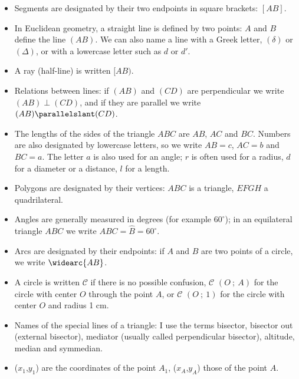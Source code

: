 \begin{itemize}
In the code, these points are referred to as M\_A, M\_B and M\_C.

Another exception concerns intermediate construction points, which are not labelled. They are often designated by a lowercase letter in the code.

\item Segments are designated by their two endpoints in square brackets: $[AB]$.

\item In Euclidean geometry, a straight line is defined by two points: $A$ and $B$ define the line $(AB)$. We can also name a line with a Greek letter, $(\delta)$ or $(\Delta)$, or with a lowercase letter such as $d$ or $d'$.

\item A ray (half-line) is written $[AB)$.

\item Relations between lines: if $(AB)$ and $(CD)$ are perpendicular we write $(AB) \perp (CD)$, and if they are parallel we write $(AB) \parallelslant (CD)$.

\item The lengths of the sides of the triangle $ABC$ are $AB$, $AC$ and $BC$. Numbers are also designated by lowercase letters, so we write $AB=c$, $AC=b$ and $BC=a$. The letter $a$ is also used for an angle; $r$ is often used for a radius, $d$ for a diameter or a distance, $l$ for a length.

\item Polygons are designated by their vertices: $ABC$ is a triangle, $EFGH$ a quadrilateral.

\item Angles are generally measured in degrees (for example $60^\circ$); in an equilateral triangle $ABC$ we write $\widehat{ABC}=\widehat{B}=60^\circ$.

\item Arcs are designated by their endpoints: if $A$ and $B$ are two points of a circle, we write $\widearc{AB}$.

\item A circle is written $\mathcal{C}$ if there is no possible confusion, $\mathcal{C}$ $(O~;~A)$ for the circle with center $O$ through the point $A$, or $\mathcal{C}$ $(O~;~1)$ for the circle with center $O$ and radius 1 cm.

\item Names of the special lines of a triangle: I use the terms bisector, bisector out (external bisector), mediator (usually called perpendicular bisector), altitude, median and symmedian.

\item ($x_1$,$y_1$) are the coordinates of the point $A_1$, ($x_A$,$y_A$) those of the point $A$.
\end{itemize}

